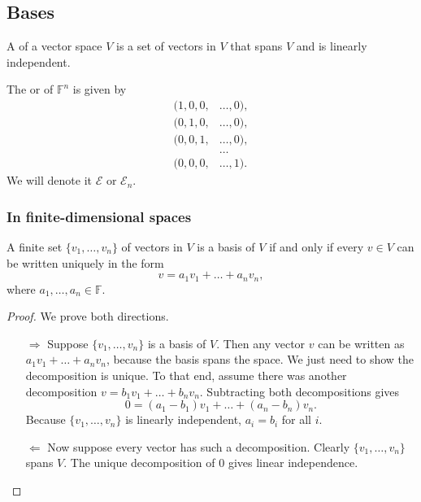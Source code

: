 \subsection{Bases}
\begin{definition}
A  of a vector space $V$ is a set of vectors in $V$ that spans $V$ and is linearly independent.
\end{definition}
\begin{example}
The  or  of $\mathbb{F}^n$ is given by
\begin{align*}
(1,0,0,&\ldots,0), \\
(0,1,0,&\ldots,0), \\
(0,0,1,&\ldots,0), \\
&\ldots \\
(0,0,0,&\ldots,1).
\end{align*}
We will denote it $\mathcal{E}$ or $\mathcal{E}_n$.
\end{example}
\subsubsection{In finite-dimensional spaces}
\begin{proposition} \label{finiteBasisUniqueDecomposition}
A finite set $\{v_1, \ldots, v_n\}$ of vectors in $V$ is a basis of $V$ \textup{if and only if} every $v\in V$ can be written uniquely in the form
\[ v = a_1v_1 + \ldots + a_nv_n, \]
where $a_1, \ldots, a_n \in \mathbb{F}$.
\end{proposition}
\begin{proof}
We prove both directions.
\begin{itemize}
\item[$\boxed{\Rightarrow}$] Suppose $\{v_1, \ldots, v_n\}$ is a basis of $V$. Then any vector $v$ can be written as $a_1v_1 + \ldots + a_nv_n$, because the basis spans the space. We just need to show the decomposition is unique. To that end, assume there was another decomposition $v = b_1v_1 + \ldots + b_nv_n$. Subtracting both decompositions gives
\[ 0 = (a_1-b_1)v_1 + \ldots + (a_n-b_n)v_n. \]
Because $\{v_1, \ldots, v_n\}$ is linearly independent, $a_i = b_i$ for all $i$.
\item[$\boxed{\Leftarrow}$] Now suppose every vector has such a decomposition. Clearly $\{v_1, \ldots, v_n\}$ spans $V$. The unique decomposition of $0$ gives linear independence.
\end{itemize}
\end{proof}

